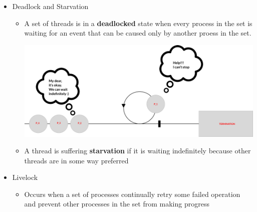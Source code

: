\documentclass[12pt]{article}
\begin{document}
\begin{itemize}
    \item Deadlock and Starvation
    \begin{itemize}
        \item A set of threads is in a \textbf{deadlocked} state when every process in the
        set is waiting for an event that can be caused only by another proess in the
        set.

        \begin{center}
            \includegraphics[width=\linewidth]{../images/week_10_notes_1_4.png}
        \end{center}

        \item A thread is suffering \textbf{starvation} if it is waiting indefinitely
        because other threads are in some way preferred
    \end{itemize}

    \bigskip


    \item Livelock
    \begin{itemize}
        \item Occurs when a set of processes continually retry some failed operation
        and prevent other processes in the set from making progress


\end{itemize}
\end{itemize}
\end{document}
